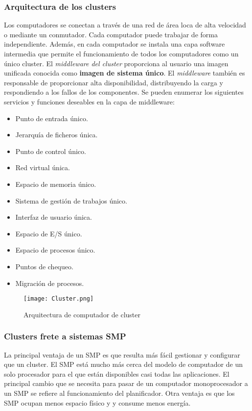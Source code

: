 \subsubsection*{Arquitectura de los clusters}

Los computadores se conectan a través de una red de área loca de alta velocidad o mediante un conmutador. Cada computador puede trabajar de forma independiente. Además, en cada computador se instala una capa software intermedia que permite el funcionamiento de todos los computadores como un único cluster. El \textit{middleware del cluster} proporciona al usuario una imagen unificada conocida como \textbf{imagen de sistema único}. El \textit{middleware} también es responsable de proporcionar alta disponibilidad, distribuyendo la carga y respondiendo a los fallos de los componentes. Se pueden enumerar los siguientes servicios y funciones deseables en la capa de middleware:

\begin{itemize}
  \item Punto de entrada único.
  \item Jerarquía de ficheros única.
  \item Punto de control único.
  \item Red virtual única.
  \item Espacio de memoria único.
  \item Sistema de gestión de trabajos único.
  \item Interfaz de usuario única.
  \item Espacio de E/S único.
  \item Espacio de procesos único.
  \item Puntos de chequeo.
  \item Migración de procesos.
\end{itemize}

\begin{figure}[H]
  \centering
  \texttt{[image: Cluster.png]}
  \caption{Arquitectura de computador de cluster}
\end{figure}

\subsubsection*{Clusters frete a sistemas SMP}

La principal ventaja de un SMP es que resulta más fácil gestionar y configurar que un cluster. El SMP está mucho más cerca del modelo de computador de un solo procesador para el que están disponibles casi todas las aplicaciones. El principal cambio que se necesita para pasar de un computador monoprocesador a un SMP se refiere al funcionamiento del planificador. Otra ventaja es que los SMP ocupan menos espacio físico y y consume menos energía.

